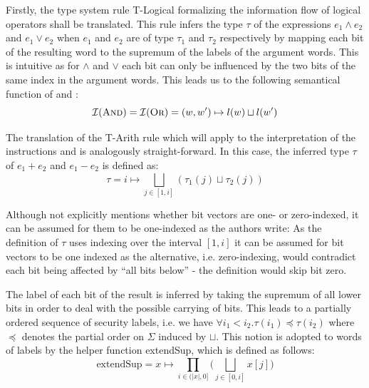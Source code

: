 Firstly, the type system rule T-Logical formalizing the information flow of logical operators shall be translated.
This rule infers the type $ \tau $ of the expressions $ e_1 \land e_2 $ and $ e_1 \lor e_2 $ when $ e_1 $ and $ e_2 $ are of type $ \tau_1 $ and $ \tau_2 $ respectively by mapping each bit of the resulting word to the supremum of the labels of the argument words.
This is intuitive as for $ \land $ and $ \lor $ each bit can only be influenced by the two bits of the same index in the argument words.
This leads us to the following semantical function of  and :
\begin{equation*}
    \mathcal{I}(\textsc{And}) = \mathcal{I}(\textsc{Or}) = (w, w') \mapsto l(w) \sqcup l(w')
\end{equation*}

The translation of the T-Arith rule which will apply to the interpretation of the instructions  and  is analogously straight-forward.
In this case, the inferred type $ \tau $ of $ e_1 + e_2 $ and $ e_1 - e_2 $ is defined as:
\begin{equation*}
    \tau = i \mapsto \bigsqcup_{j \in [1, i]} (\tau_1(j) \sqcup \tau_2(j))
\end{equation*}

Although \cite{Ferraiuolo17} not explicitly mentions whether bit vectors are one- or zero-indexed, it can be assumed for them to be one-indexed as the authors write: 
As the definition of $ \tau $ uses indexing over the interval $ [ 1, i ] $ it can be assumed for bit vectors to be one indexed as the alternative, i.e. zero-indexing, would contradict each bit being affected by \enquote{all bits below} - the definition would skip bit zero.

The label of each bit of the result is inferred by taking the supremum of all lower bits in order to deal with the possible carrying of bits.
This leads to a partially ordered sequence of security labels, i.e. we have $ \forall i_1 < i_2. \tau(i_1) \preceq \tau(i_2) $ where $ \preceq $ denotes the partial order on $ \Sigma $ induced by $ \sqcup $.
This notion is adopted to words of labels by the helper function extendSup, which is defined as follows:
\begin{equation*}
    \text{extendSup} = x \mapsto \prod_{i \in (|x|, 0]} \Big( \bigsqcup_{j \in [0, i]} x[j] \Big)
\end{equation*}

